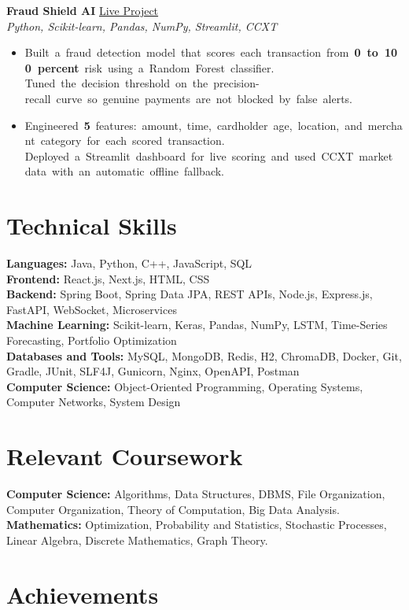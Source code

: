 \documentclass[a4paper,10pt]{article}
\newcommand{\pairItem}[2]{\item \mbox{#1}\\\mbox{#2}}
\newcommand{\projectHeader}[4]{
  \textbf{#1} \hfill \href{#3}{#4}\\
  \textit{#2}
}
\begin{document}
\projectHeader
{Fraud Shield AI}
{Python, Scikit-learn, Pandas, NumPy, Streamlit, CCXT}
{https://fraudsheild-ai-4ruti3ugr9qcuafvmdxekm.streamlit.app/}
{Live Project}

\begin{itemize}
  \pairItem
    {Built a fraud detection model that scores each transaction from \textbf{0 to 100 percent} risk using a Random Forest classifier.}
    {Tuned the decision threshold on the precision-recall curve so genuine payments are not blocked by false alerts.}
  \pairItem
    {Engineered \textbf{5} features: amount, time, cardholder age, location, and merchant category for each scored transaction.}
    {Deployed a Streamlit dashboard for live scoring and used CCXT market data with an automatic offline fallback.}
\end{itemize}

\section{Technical Skills}

\textbf{Languages:} Java, Python, C++, JavaScript, SQL\\
\textbf{Frontend:} React.js, Next.js, HTML, CSS\\
\textbf{Backend:} Spring Boot, Spring Data JPA, REST APIs, Node.js, Express.js, FastAPI, WebSocket, Microservices\\
\textbf{Machine Learning:} Scikit-learn, Keras, Pandas, NumPy, LSTM, Time-Series Forecasting, Portfolio Optimization\\
\textbf{Databases and Tools:} MySQL, MongoDB, Redis, H2, ChromaDB, Docker, Git, Gradle, JUnit, SLF4J, Gunicorn, Nginx, OpenAPI, Postman\\
\textbf{Computer Science:} Object-Oriented Programming, Operating Systems, Computer Networks, System Design

\section{Relevant Coursework}

\textbf{Computer Science:} Algorithms, Data Structures, DBMS, File Organization, Computer Organization, Theory of Computation, Big Data Analysis.\\
\textbf{Mathematics:} Optimization, Probability and Statistics, Stochastic Processes, Linear Algebra, Discrete Mathematics, Graph Theory.

\section{Achievements}
\end{document}
